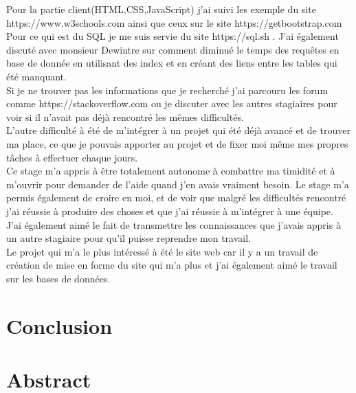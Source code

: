 \documentclass[12pt,a4paper]{report}
\begin{document}
Pour la partie client(HTML,CSS,JavaScript) j'ai suivi les exemple du site https://www.w3schools.com ainsi que ceux sur le site https://getbootstrap.com\\

Pour ce qui est du SQL je me suis servie du site https://sql.sh . J'ai également discuté avec monsieur Dewintre sur comment diminué le temps des requêtes en base de donnée en utilisant des index et en créant des liens entre les tables qui été manquant.\\

Si je ne trouver pas les informations que je recherché j'ai parcouru les forum  comme https://stackoverflow.com ou je discuter avec les autres stagiaires pour voir si il n'avait pas déjà rencontré les mêmes difficultés.\\

L'autre difficulté à été de m'intégrer à un projet qui été déjà avancé et de trouver ma place, ce que je pouvais apporter au projet et de fixer moi même mes propres tâches à effectuer chaque jours.\\

Ce stage m'a appris à être totalement autonome à combattre ma timidité et à m'ouvrir pour demander de l'aide quand j'en avais vraiment besoin. Le stage m'a permis également de croire en moi, et de voir que malgré les difficultés rencontré j'ai réussie à produire des choses et que j'ai réussie à m'intégrer à une équipe.\\

J'ai également aimé le fait de transmettre les connaissances que j'avais appris à un autre stagiaire pour qu'il puisse reprendre mon travail.\\

Le projet qui m'a le plus intéressé à été le site web car il y a un travail de création de mise en forme du site qui m'a plus et j'ai également aimé le travail sur les bases de données.

\chapter[Conclusion]{Conclusion}


\chapter[Abstact]{Abstract}
\end{document}
